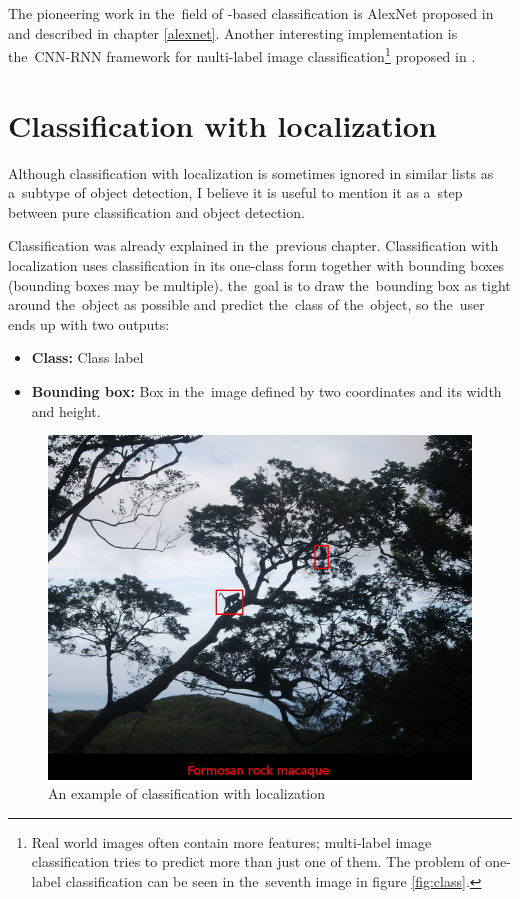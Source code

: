 The pioneering work in the~field of -based classification is AlexNet 
proposed in \cite{cnn-classification} and described in chapter \ref{alexnet}. 
Another interesting implementation is the~CNN-RNN framework for multi-label 
image classification\footnote{Real world images often contain more features; 
multi-label image classification tries to predict more than just one of them. 
The problem of one-label classification can be seen in the~seventh image in 
figure \ref{fig:class}.} proposed in \cite{multi-classification}.

\section{Classification with localization}
\label{classification-localization}

Although classification with localization is sometimes ignored in similar lists 
as a~subtype of object detection, I believe it is useful to mention it as a~step 
between pure classification and object detection.

Classification was already explained in the~previous chapter. Classification 
with localization uses classification in its one-class form together with 
bounding boxes (bounding boxes may be multiple). the~goal is to draw
the~bounding box as tight around the~object as possible and predict the~class of
the~object, so the~user ends up with two outputs:
\begin{itemize}
	\item \textbf{Class:} Class label
	\item \textbf{Bounding box:} Box in the~image defined by two coordinates and
	its width and height.
\end{itemize}

\begin{figure}[H]
   \centering
	\includegraphics[width=.7\linewidth]{./pictures/class-loc.JPG}
	\caption[Classification with localization example]{An example of classification 
	with localization}
      \label{fig:class-loc}
\end{figure}

